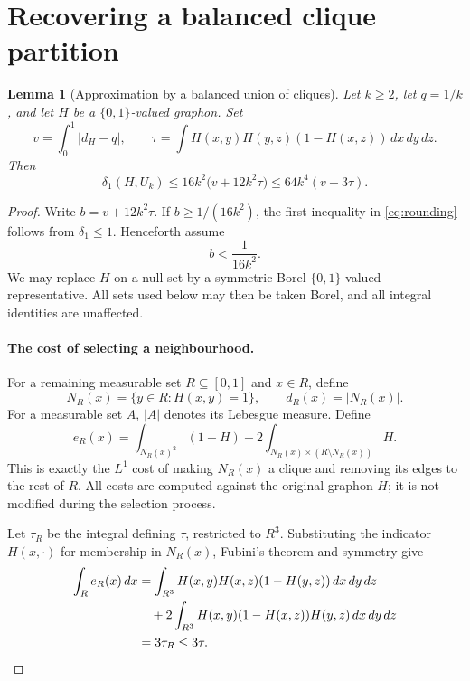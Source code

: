 \documentclass[11pt]{article}
\newtheorem{lemma}{Lemma}[section]
\theoremstyle{remark}
\begin{document}
\section{Recovering a balanced clique partition}\label{sec:rounding}

\begin{lemma}[Approximation by a balanced union of cliques]
\label{lem:rounding}
Let $k\geq2$, let $q=1/k$, and let $H$ be a $\{0,1\}$-valued graphon.
Set
\[
 v=\int_0^1|d_H-q|,\qquad
 \tau=\int H(x,y)H(y,z)(1-H(x,z))\,dx\,dy\,dz.
\]
Then
\begin{equation}\label{eq:rounding}
 \delta_1(H,U_k)
 \leq16k^2\bigl(v+12k^2\tau\bigr)
 \leq64k^4(v+3\tau).
\end{equation}
\end{lemma}

\begin{proof}
Write $b=v+12k^2\tau$. If $b\geq1/(16k^2)$, the first inequality
in \eqref{eq:rounding} follows from $\delta_1\leq1$.
Henceforth assume
\begin{equation}\label{eq:small-b}
 b<\frac{1}{16k^2}.
\end{equation}
We may replace $H$ on a null set by a symmetric Borel
$\{0,1\}$-valued representative. All sets used below may then be
taken Borel, and all integral identities are unaffected.

\paragraph{The cost of selecting a neighbourhood.}
For a remaining measurable set $R\subseteq[0,1]$ and $x\in R$, define
\[
 N_R(x)=\{y\in R:H(x,y)=1\},\qquad d_R(x)=|N_R(x)|.
\]
For a measurable set $A$, $|A|$ denotes its Lebesgue measure.
Define
\begin{equation}\label{eq:local-cost}
 e_R(x)=\int_{N_R(x)^2}(1-H)
       +2\int_{N_R(x)\times(R\setminus N_R(x))}H.
\end{equation}
This is exactly the $L^1$ cost of making $N_R(x)$ a clique and
removing its edges to the rest of $R$.
All costs are computed against the original graphon $H$; it is not
modified during the selection process.

Let $\tau_R$ be the integral defining $\tau$, restricted to $R^3$.
Substituting the indicator $H(x,\cdot)$ for membership in $N_R(x)$,
Fubini's theorem and symmetry give
\begin{align}
 \int_R e_R(x)\,dx
 &=\int_{R^3}H(x,y)H(x,z)(1-H(y,z))\,dx\,dy\,dz\notag\\
 &\quad+2\int_{R^3}H(x,y)(1-H(x,z))H(y,z)\,dx\,dy\,dz\notag\\
 &=3\tau_R\leq3\tau.\label{eq:average-cost}
\end{align}


\end{proof}
\end{document}

